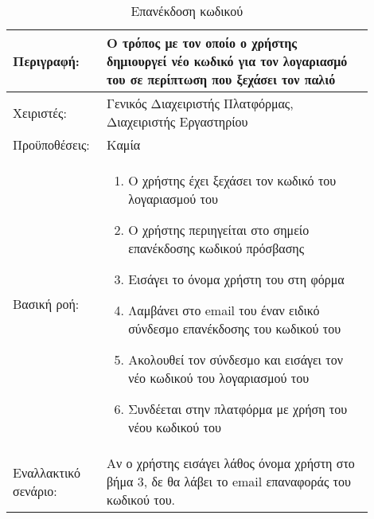 \begin{table}[h]
	\caption{Επανέκδοση κωδικού}
	\label{tab:use-case-forgot-password}
	\begin{tabular}{|p{0.2\linewidth}|p{0.7\linewidth}|}
		\hline
		Περιγραφή: & Ο τρόπος με τον οποίο ο χρήστης δημιουργεί νέο κωδικό για τον λογαριασμό του σε περίπτωση που ξεχάσει τον παλιό \\ \hline
		Χειριστές: & Γενικός Διαχειριστής Πλατφόρμας, Διαχειριστής Εργαστηρίου \\ \hline
		Προϋποθέσεις: & Καμία \\ \hline
		Βασική ροή: & 
		\vspace{-0.5cm}
		\begin{enumerate}
			\item Ο χρήστης έχει ξεχάσει τον κωδικό του λογαριασμού του
			\item Ο χρήστης περιηγείται στο σημείο επανέκδοσης κωδικού πρόσβασης
			\item Εισάγει το όνομα χρήστη του στη φόρμα
			\item Λαμβάνει στο email του έναν ειδικό σύνδεσμο επανέκδοσης του κωδικού του
			\item Ακολουθεί τον σύνδεσμο και εισάγει τον νέο κωδικού του λογαριασμού του
			\item Συνδέεται στην πλατφόρμα με χρήση του νέου κωδικού του
		\end{enumerate}\vspace{-0.7cm} \\ \hline
		Εναλλακτικό σενάριο: & Αν ο χρήστης εισάγει λάθος όνομα χρήστη στο βήμα 3, δε θα λάβει το email επαναφοράς του κωδικού του. \\ \hline
	\end{tabular}
\end{table}

